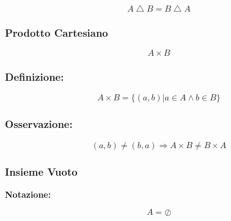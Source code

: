 \documentclass{article}
\begin{document}
        \begin{Large}
            \begin{equation*}
                A \bigtriangleup B = B \bigtriangleup A
            \end{equation*}
        \end{Large}

        \subsubsection{Prodotto Cartesiano}
        \begin{LARGE}
            \begin{equation*}
                A \times B
            \end{equation*}
        \end{LARGE}
        
        \subsubsection*{Definizione:}
        
        \begin{LARGE}
            \begin{equation*}
                A \times B = \{(a,b) | a \in A \wedge b \in B\}
            \end{equation*}
        \end{LARGE}

        \subsubsection*{Osservazione:}

        \begin{Large}
            \begin{equation*}
                (a,b) \ne (b,a) \Rightarrow A \times B \ne B \times A
            \end{equation*}
        \end{Large}

        \subsubsection{Insieme Vuoto}
            \textbf{Notazione:}\newline
            \begin{LARGE}
                \begin{equation*}
                    A = \oslash
                \end{equation*}
            \end{LARGE}
\end{document}
